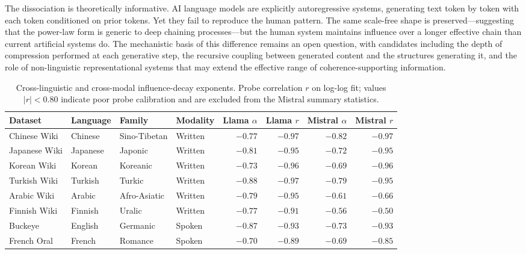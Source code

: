 \documentclass[9pt,twocolumn,twoside]{pnas-new}
\begin{document}
The dissociation is theoretically informative. AI language models are explicitly autoregressive systems, generating text token by token with each token conditioned on prior tokens. Yet they fail to reproduce the human pattern. The same scale-free shape is preserved---suggesting that the power-law form is generic to deep chaining processes---but the human system maintains influence over a longer effective chain than current artificial systems do. The mechanistic basis of this difference remains an open question, with candidates including the depth of compression performed at each generative step, the recursive coupling between generated content and the structures generating it, and the role of non-linguistic representational systems that may extend the effective range of coherence-supporting information.


\begin{table}[t!]
\centering
\caption{Cross-linguistic and cross-modal influence-decay exponents. Probe correlation $r$ on log-log fit; values $|r| < 0.80$ indicate poor probe calibration and are excluded from the Mistral summary statistics.}
\label{tab:exponents}
\begin{tabular*}{\textwidth}{@{\extracolsep{\fill}}llllrrrr@{}}
\toprule
Dataset & Language & Family & Modality & Llama $\alpha$ & Llama $r$ & Mistral $\alpha$ & Mistral $r$ \\
\midrule
Chinese Wiki  & Chinese  & Sino-Tibetan & Written & $-0.77$ & $-0.97$ & $-0.82$ & $-0.97$ \\
Japanese Wiki & Japanese & Japonic      & Written & $-0.81$ & $-0.95$ & $-0.72$ & $-0.95$ \\
Korean Wiki   & Korean   & Koreanic     & Written & $-0.73$ & $-0.96$ & $-0.69$ & $-0.96$ \\
Turkish Wiki  & Turkish  & Turkic       & Written & $-0.88$ & $-0.97$ & $-0.79$ & $-0.95$ \\
Arabic Wiki   & Arabic   & Afro-Asiatic & Written & $-0.79$ & $-0.95$ & $-0.61$ & $-0.66$ \\
Finnish Wiki  & Finnish  & Uralic       & Written & $-0.77$ & $-0.91$ & $-0.56$ & $-0.50$ \\
Buckeye       & English  & Germanic     & Spoken  & $-0.87$ & $-0.93$ & $-0.73$ & $-0.93$ \\
French Oral   & French   & Romance      & Spoken  & $-0.70$ & $-0.89$ & $-0.69$ & $-0.85$ \\
\bottomrule
\end{tabular*}
\end{table}
\end{document}

